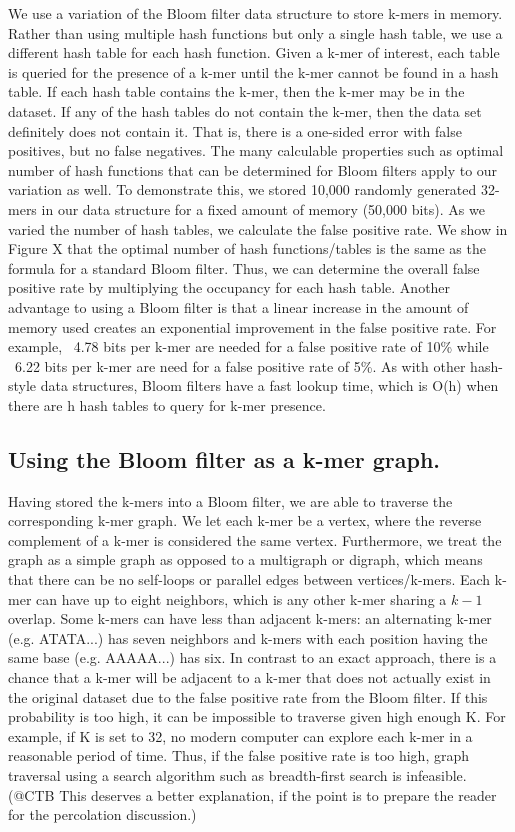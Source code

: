 \documentclass[12pt]{article} \usepackage{simplemargins}
\begin{document}
We use a variation of the Bloom filter data structure to store k-mers
in memory. Rather than using multiple hash functions but only a single
hash table, we use a different hash table for each hash
function. Given a k-mer of interest, each table is queried for the
presence of a k-mer until the k-mer cannot be found in a hash
table. If each hash table contains the k-mer, then the k-mer may
be in the dataset. If any of the hash tables do not contain the
k-mer, then the data set definitely does not contain it. That is, there is a one-sided
error with false positives, but no false negatives. The many
calculable properties such as optimal number of hash functions that
can be determined for Bloom filters apply to our variation as well. To
demonstrate this, we stored 10,000 randomly generated 32-mers in our
data structure for a fixed amount of memory (50,000 bits). As we
varied the number of hash tables, we calculate the false positive
rate. We show in Figure X that the optimal number of hash
functions/tables is the same as the formula for a standard Bloom
filter. Thus, we can determine the overall false positive rate by
multiplying the occupancy for each hash table. Another advantage to
using a Bloom filter is that a linear increase in the amount of memory
used creates an exponential improvement in the false positive
rate. For example, ~4.78 bits per k-mer are needed for a false
positive rate of 10\% while ~6.22 bits per k-mer are need for a false
positive rate of
5\%. As with other hash-style data structures, Bloom filters have a
fast lookup time, which is O(h) when there are h hash tables to query
for k-mer presence.

\subsection{Using the Bloom filter as a k-mer graph.}
Having stored the k-mers into a Bloom filter, we are able to traverse
the corresponding k-mer graph. We let each k-mer be a vertex, where
the reverse complement of a k-mer is considered the same
vertex. Furthermore, we treat the graph as a simple graph as opposed
to a multigraph or digraph, which means that there can be no
self-loops or parallel edges between vertices/k-mers. Each k-mer can
have up to eight neighbors, which is any other k-mer sharing a $k-1$ 
overlap. Some k-mers can have less than adjacent k-mers: an alternating k-mer
(e.g. ATATA...) has seven neighbors and k-mers with each position
having the same base (e.g. AAAAA...) has six. In contrast to an exact
approach, there is a chance that a k-mer will be adjacent to a k-mer
that does not actually exist in the original dataset due to the false
positive rate from the Bloom filter. If this probability is too high,
it can be impossible to traverse given high enough K. For example, if
K is set to 32, no modern computer can explore each k-mer in a
reasonable period of time. Thus, if the false positive rate is too
high, graph traversal using a search algorithm such as breadth-first
search is infeasible.  (@CTB This deserves a better explanation, if
the point is to prepare the reader for the percolation discussion.)
\end{document}
